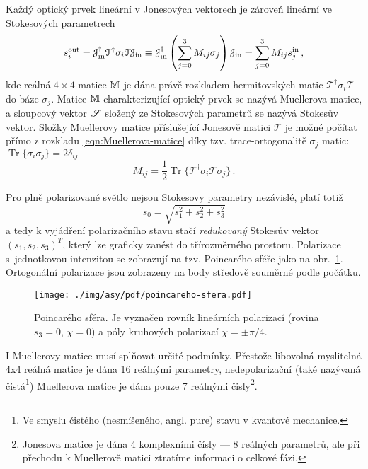 Každý optický prvek lineární v Jonesových vektorech je zároveň lineární ve Stokesových parametrech
\begin{equation} 
\label{eqn:Muellerova-matice}
s^\textrm{out}_i=\mathcal{J}_\textrm{in}^\dagger \mathcal{T}^\dagger \sigma_i \mathcal{T} \mathcal{J}_\textrm{in}\equiv\mathcal{J}^\dagger_\textrm{in} \left(\sum_{j=0}^{3} M_{ij} \sigma_j \right) \mathcal{J}_\textrm{in}
    =\sum_{j=0}^{3} M_{ij} s^\textrm{in}_j \,,
\end{equation}
kde reálná $4\times 4$ matice $\mathbb{M}$ je dána právě rozkladem hermitovských matic $\mathcal{T}^\dagger \sigma_i \mathcal{T}$ do báze $\sigma_j$.
Matice $\mathbb{M}$ charakterizující optický prvek se nazývá Muellerova matice, a sloupcový vektor $\mathscr{S}$ složený ze Stokesových parametrů se nazývá Stokesův vektor.
Složky Muellerovy matice příslušející Jonesově matici $\mathcal{T}$ je možné počítat přímo z rozkladu \eqref{eqn:Muellerova-matice} díky tzv. trace-ortogonalitě $\sigma_j$ matic: $\operatorname{Tr}\lbrace\sigma_i\sigma_j\rbrace=2\delta_{ij}$
\begin{equation} 
\label{eqn:Mueller-rozklad}
    M_{ij}=\frac{1}{2}\operatorname{Tr}\lbrace \mathcal{T}^\dagger \sigma_i \mathcal{T} \sigma_j \rbrace \,.
\end{equation}

Pro plně polarizované světlo nejsou Stokesovy parametry nezávislé, platí totiž
\begin{equation} 
\label{e:norma S}
    s_0=\sqrt{s_1^2+s_2^2+s_3^2}
\end{equation}
a tedy k vyjádření polarizačního stavu stačí \emph{redukovaný} Stokesův vektor $(s_1, s_2, s_3)^T$, který lze graficky zanést do třírozměrného prostoru.
Polarizace s~jednotkovou intenzitou se zobrazují na tzv. Poincarého sféře jako na obr.~\ref{fig:Poincareho-sfera}.
Ortogonální polarizace jsou zobrazeny na body středově souměrné podle počátku.

\begin{figure}[htbp]
    \centering
    \texttt{[image: ./img/asy/pdf/poincareho-sfera.pdf]}
    \caption{Poincarého sféra. Je vyznačen rovník lineárních polarizací (rovina $s_3=0$, $\chi=0$) a póly kruhových polarizací $\chi=\pm \pi/4$.}
    \label{fig:Poincareho-sfera}
\end{figure}

I Muellerovy matice musí splňovat určité podmínky.
Přestože libovolná myslitelná 4x4 reálná matice je dána 16 reálnými parametry, nedepolarizační (také nazývaná čistá\footnote{Ve smyslu čistého (nesmíšeného, angl. pure) stavu v kvantové mechanice.}) Muellerova matice je dána pouze 7 reálnými čisly\footnote{Jonesova matice je dána 4 komplexními čísly --- 8 reálných parametrů, ale při přechodu k Muellerově matici ztratíme informaci o celkové fázi.}\cite{ossikovskiDifferentialMatrixFormalism2011}.

